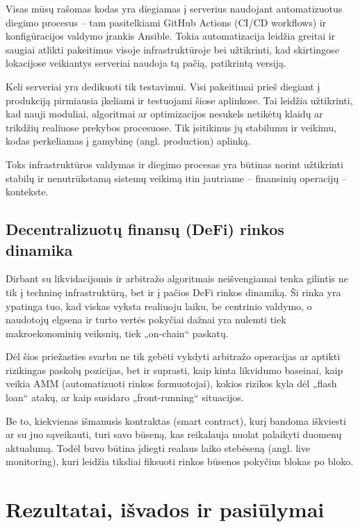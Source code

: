 \documentclass[]{VUMIFTemplateClass}
\begin{document}
Visas mūsų rašomas kodas yra diegiamas į serverius naudojant automatizuotus diegimo procesus – tam pasitelkiami GitHub Actions (CI/CD workflows) ir konfigūracijos valdymo įrankis Ansible. Tokia automatizacija leidžia greitai ir saugiai atlikti pakeitimus visoje infrastruktūroje bei užtikrinti, kad skirtingose lokacijose veikiantys serveriai naudoja tą pačią, patikrintą versiją.

Keli serveriai yra dedikuoti tik testavimui. Visi pakeitimai prieš diegiant į produkciją pirmiausia įkeliami ir testuojami šiose aplinkose. Tai leidžia užtikrinti, kad nauji moduliai, algoritmai ar optimizacijos nesukels netikėtų klaidų ar trikdžių realiuose prekybos procesuose. Tik įsitikinus jų stabilumu ir veikimu, kodas perkeliamas į gamybinę (angl. production) aplinką.

Toks infrastruktūros valdymas ir diegimo procesas yra būtinas norint užtikrinti stabilų ir nenutrūkstamą sistemų veikimą itin jautriame – finansinių operacijų – kontekste.

\subsection{Decentralizuotų finansų (DeFi) rinkos dinamika}

Dirbant su likvidacijomis ir arbitražo algoritmais neišvengiamai tenka gilintis ne tik į techninę infrastruktūrą, bet ir į pačios DeFi rinkos dinamiką. Ši rinka yra ypatinga tuo, kad viskas vyksta realiuoju laiku, be centrinio valdymo, o naudotojų elgsena ir turto vertės pokyčiai dažnai yra nulemti tiek makroekonominių veiksnių, tiek „on-chain“ paskatų.

Dėl šios priežasties svarbu ne tik gebėti vykdyti arbitražo operacijas ar aptikti rizikingas paskolų pozicijas, bet ir suprasti, kaip kinta likvidumo baseinai, kaip veikia AMM (automatizuoti rinkos formuotojai), kokios rizikos kyla dėl „flash loan“ atakų, ar kaip susidaro „front-running“ situacijos.

Be to, kiekvienas išmanusis kontraktas (smart contract), kurį bandoma iškviesti ar su juo sąveikauti, turi savo būseną, kas reikalauja nuolat palaikyti duomenų aktualumą. Todėl buvo būtina įdiegti realaus laiko stebėseną (angl. live monitoring), kuri leidžia tiksliai fiksuoti rinkos būsenos pokyčius blokas po bloko.

\section{Rezultatai, išvados ir pasiūlymai}
\end{document}
